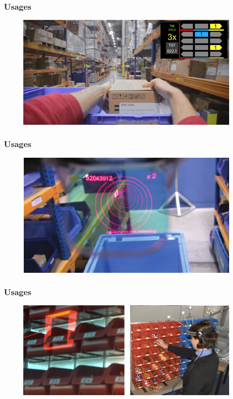 \begin{frame}\frametitle{Usages}
	\begin{figure}
		\includegraphics[width=\textwidth]{images/dhl-vision-picking-7-668}
	\end{figure}
\end{frame}
\begin{frame}\frametitle{Usages}
	\begin{figure}
		\includegraphics[width=\textwidth]{images/PickByVision}
	\end{figure}
\end{frame}

\begin{frame}\frametitle{Usages}
	\begin{figure}
		\includegraphics[width=\textwidth]{images/kommissionieren-augmented-reality}
	\end{figure}
\end{frame}


